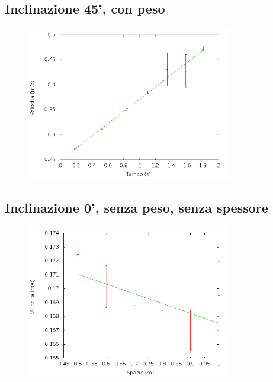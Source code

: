 \documentclass[12pt]{article} %
\begin{document}
	\subsection {Inclinazione 45', con peso}
		\begin{figure}[H]
		\centering
		\includegraphics[width=0.8\textwidth]{velocita_45gradi_peso}
		\label{fig:45p}
	\end{figure}
 
	\subsection {Inclinazione 0', senza peso, senza spessore}
	\begin{figure}[H]
		\centering
		\includegraphics[width=0.8\textwidth]{velocita_0gradi_normale}
		\label{fig:0n}
	\end{figure}
	
\end{document}
